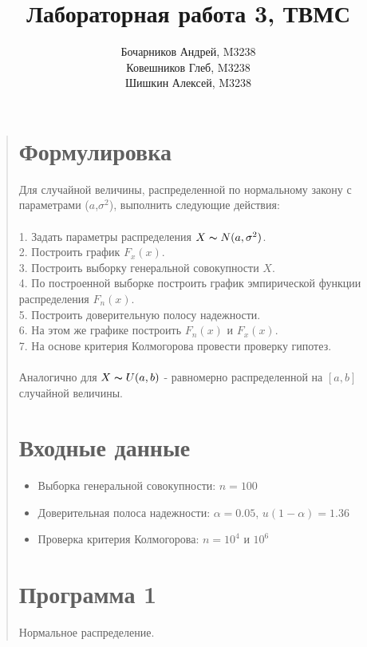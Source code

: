 \documentclass{article}
\begin{document}
\title{Лабораторная работа 3, ТВМС}
\author{
	Бочарников Андрей, M3238\\
	Ковешников Глеб, M3238\\
	Шишкин Алексей, M3238
}
\maketitle

\begin{quote}
\section{Формулировка}
	Для случайной величины, распределенной по нормальному закону с параметрами ($a$,$\sigma^2$), выполнить следующие действия:\\\\
	1. Задать параметры распределения $X \thicksim N(a, \sigma^2)$.\\
	2. Построить график $F_x(x)$.\\
	3. Построить выборку генеральной совокупности $X$.\\
	4. По построенной выборке построить график эмпирической функции распределения $F_n(x)$.\\
	5. Построить доверительную полосу надежности.\\
	6. На этом же графике построить $F_n(x)$ и $F_x(x)$.\\
	7. На основе критерия Колмогорова провести проверку гипотез.\\\\
	Аналогично для $X \thicksim U(a, b)$ - равномерно распределенной на $[a, b]$ случайной величины.
\section{Входные данные}
        \begin{itemize}
            \item Выборка генеральной совокупности: $n = 100$
	    \item Доверительная полоса надежности: $\alpha = 0.05$, $u(1 - \alpha) = 1.36$
            \item Проверка критерия Колмогорова: $n = 10^4$ и $10^6$
        \end{itemize}
\section{Программа 1}
	Нормальное распределение.

\end{quote}
\end{document}
